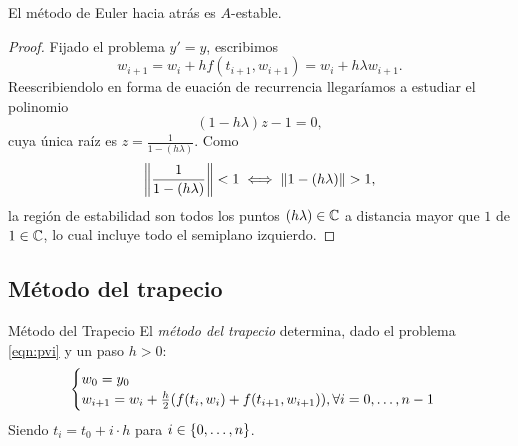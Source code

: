 
\begin{proposition}
    El método de Euler hacia atrás es $A$-estable.

\begin{proof}
    Fijado el problema $y' = y$, escribimos
    \begin{equation*}
        w_{i+1} = w_i + hf(t_{i+1}, w_{i+1}) = w_i + h\lambda w_{i+1}.
    \end{equation*}
    Reescribiendolo en forma de euación de recurrencia
    llegaríamos a estudiar el polinomio
    \begin{equation*}
        (1 - h\lambda)z - 1 = 0,
    \end{equation*}
    cuya única raíz es $z = \frac{1}{1 - (h\lambda)}$.
    Como
    \begin{equation*}
        \norm{\frac{1}{1 - (h\lambda)}} < 1 \iff
        \norm{1 - (h\lambda)} > 1,
    \end{equation*}
    la región de estabilidad son todos los puntos $(h\lambda) \in \mathbb{C}$
    a distancia mayor que $1$ de $1 \in \mathbb{C}$,
    lo cual incluye todo el semiplano izquierdo.
\end{proof}
\end{proposition}

\subsection{Método del trapecio}

\begin{method}{Método del Trapecio}
    El \emph{método del trapecio} determina,
    dado el problema \ref{eqn:pvi} y un paso $h > 0$:
%
    \begin{equation}\label{eqn:trapezoidalsol}
    \begin{cases}
        w_0 = y_0 \\
        w_{i+1} = w_i + \frac{h}{2}\qty(
            f(t_i, w_i) + f(t_{i+1}, w_{i+1})
        ), \forall i=0,\dots, n-1
    \end{cases}
    \end{equation}
%
    Siendo $t_i = t_0 + i\cdot h$ para $i \in \qty{0,\ldots, n}$.
\end{method}

